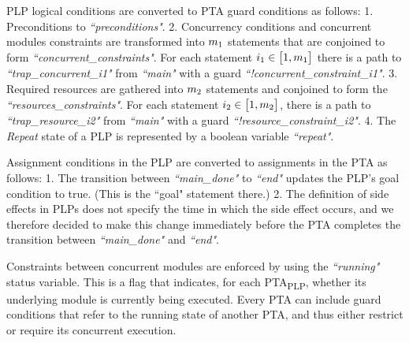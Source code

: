 \documentclass[letterpaper]{article}
\newcommand\aNote[1]{\todo[inline, author=Alex, color=GreenYellow]{#1}}
\begin{document}
\par PLP logical conditions are converted to PTA guard conditions
as follows: 1. Preconditions to \textit{``preconditions"}. 2. Concurrency conditions and concurrent modules constraints are transformed into $m\textsubscript{1}$ statements that are conjoined to form \textit{``concurrent\_constraints"}. For each statement $i\textsubscript{1} \in \big[ 1, m\textsubscript{1} \big]$ there is a path to \textit{``trap\_concurrent\_i1"} from \textit{``main"} with a guard \textit{``!concurrent\_constraint\_i1"}.
%
3. Required resources are gathered into $m\textsubscript{2}$ statements and conjoined to form the \textit{``resources\_constraints"}. For each statement $i\textsubscript{2} \in \big[ 1, m\textsubscript{2} \big]$, there is a path to \textit{``trap\_resource\_i2"} from \textit{``main"} with a guard \textit{``!resource\_constraint\_i2"}. 4. The \textit{Repeat} state of a PLP is represented by a boolean variable \textit{``repeat"}.
\par Assignment conditions in the PLP are converted to assignments in the PTA as follows: 1.
The transition between \textit{``main\_done"} to \textit{``end"} updates the
PLP's goal condition to true. (This is the ``goal" statement there.)
2. The definition of side effects in PLPs does not specify the time in which the side effect occurs,
and we therefore decided to make this change immediately before the PTA
completes the transition between  \textit{``main\_done"} and \textit{``end"}.
\par Constraints between concurrent modules are enforced by using
the \textit{``running"} status variable. This is a flag that indicates, for each PTA\textsubscript{PLP}, whether its underlying module is currently being executed.
Every PTA can include guard conditions that refer
to the running state of another PTA, and thus either restrict or
require its concurrent execution.
\end{document}
